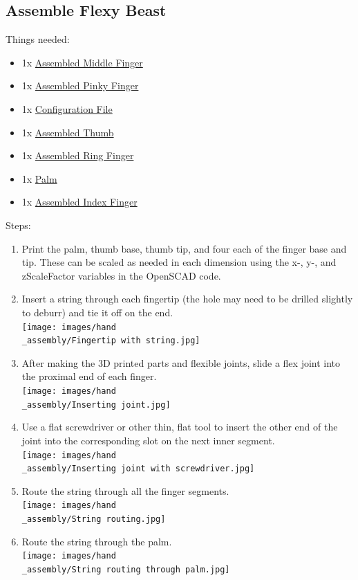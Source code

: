 \documentclass[11pt]{article}
\begin{document}
\subsection{Assemble Flexy Beast}
Things needed:
\begin{itemize}
\item 1x \hyperlink{thing_middle\_finger\_assembly}{Assembled Middle Finger}
\item 1x \hyperlink{thing_pinky\_finger\_assembly}{Assembled Pinky Finger}
\item 1x \hyperlink{thing_config\_file}{Configuration File}
\item 1x \hyperlink{thing_thumb\_assembly}{Assembled Thumb}
\item 1x \hyperlink{thing_ring\_finger\_assembly}{Assembled Ring Finger}
\item 1x \hyperlink{thing_palm}{Palm}
\item 1x \hyperlink{thing_index\_finger\_assembly}{Assembled Index Finger}
\end{itemize}
Steps:
\begin{enumerate}
\item Print the palm, thumb base, thumb tip, and four each of the finger base and tip. These can be scaled as needed in each dimension using the x-, y-, and zScaleFactor variables in the OpenSCAD code.
\item Insert a string through each fingertip (the hole may need to be drilled slightly to deburr) and tie it off on the end.\\ \texttt{[image: images/hand\\\_assembly/Fingertip with string.jpg]}
\item After making the 3D printed parts and flexible joints, slide a flex joint into the proximal end of each finger.\\ \texttt{[image: images/hand\\\_assembly/Inserting joint.jpg]}
\item Use a flat screwdriver or other thin, flat tool to insert the other end of the joint into the corresponding slot on the next inner segment.\\ \texttt{[image: images/hand\\\_assembly/Inserting joint with screwdriver.jpg]}
\item Route the string through all the finger segments.\\ \texttt{[image: images/hand\\\_assembly/String routing.jpg]}
\item Route the string through the palm.\\ \texttt{[image: images/hand\\\_assembly/String routing through palm.jpg]}
\end{enumerate}

\newpage
\end{document}
